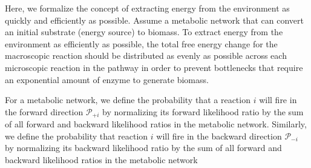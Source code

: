 Here, we formalize the concept of extracting energy from the environment as quickly and efficiently as possible. Assume a metabolic network that can convert an initial substrate (energy source) to biomass. To extract energy from the environment as efficiently as possible, the total free energy change for the macroscopic reaction should be distributed as evenly as possible across each microscopic reaction in the pathway in order to prevent bottlenecks that require an exponential amount of enzyme to generate biomass.


For a metabolic network, we define the probability that a reaction $i$ will fire in the forward  direction ${\mathcal P_{+i}}$ by normalizing its forward likelihood ratio by the sum of all forward and backward likelihood ratios in the metabolic network. Similarly, we define the probability that reaction $i$ will fire in the backward direction $\mathcal P_{-i}$ by normalizing its backward likelihood ratio by  the sum of all forward and backward likelihood ratios in the metabolic network